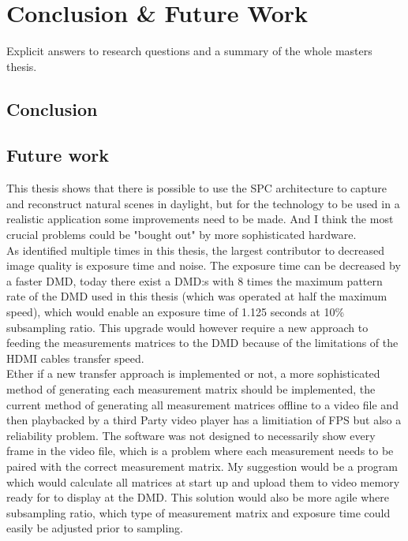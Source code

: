 \section{Conclusion \& Future Work}
Explicit answers to research questions and a summary of the whole masters thesis.

\subsection{Conclusion}

\subsection{Future work}
This thesis shows that there is possible to use the SPC architecture to capture and reconstruct natural scenes in daylight, but for the technology to be used in a realistic application some improvements need to be made. And I think the most crucial problems could be "bought out" by more sophisticated hardware.\\[0.1in]

As identified multiple times in this thesis, the largest contributor to decreased image quality is exposure time and noise. The exposure time can be decreased by a faster DMD, today there exist a DMD:s with 8 times the maximum pattern rate of the DMD used in this thesis (which was operated at half the maximum speed), which would enable an exposure time of 1.125 seconds at 10\% subsampling ratio. This upgrade would however require a new approach to feeding the measurements matrices to the DMD because of the limitations of the HDMI cables transfer speed.\\[0.1in]

Ether if a new transfer approach is implemented or not, a more sophisticated method of generating each measurement matrix should be implemented, the current method of generating all  measurement matrices offline to a video file and then playbacked by a third Party video player has a limitiation of FPS but also a reliability problem. The software was not designed to necessarily show every frame in the video file, which is a problem where each measurement needs to be paired with the correct measurement matrix. My suggestion would be a program which would calculate all matrices at start up and upload them to video memory ready for to display at the DMD. This solution would also be more agile where subsampling ratio, which type of measurement matrix and exposure time could easily be adjusted prior to sampling.\\[0.1in]

